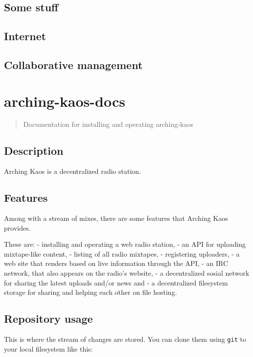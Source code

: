\documentclass[12pt]{report}
\begin{document}
\section{Some stuff}
\section{Internet}
\section{Collaborative management}


\chapter{arching-kaos-docs}\label{arching-kaos-docs}

\begin{quote}
Documentation for installing and operating arching-kaos
\end{quote}

\section{Description}\label{description}

Arching Kaos is a decentralized radio station.

\section{Features}\label{features}

Among with a stream of mixes, there are some features that Arching Kaos
provides.

These are: - installing and operating a web radio station, - an API for
uploading mixtape-like content, - listing of all radio mixtapes, -
registering uploaders, - a web site that renders based on live
information through the API, - an IRC network, that also appears on the
radio's website, - a decentralized sosial network for sharing the latest
uploads and/or news and - a decentralized filesystem storage for sharing
and helping each other on file hosting.

\section{Repository usage}\label{repository-usage}

This is where the stream of changes are stored. You can clone them using
\texttt{git} to your local filesystem like this:
\end{document}
